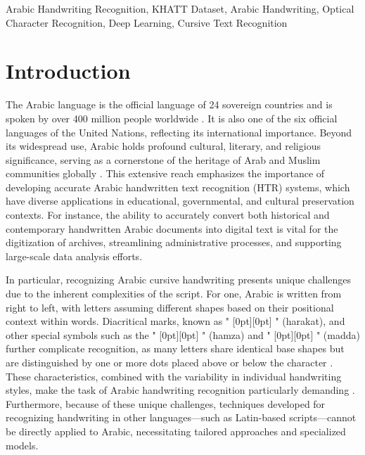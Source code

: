 \documentclass[conference]{IEEEtran}
\newcommand{\artext}[1]{%
  {\fontsize{8pt}{11pt}\selectfont \raisebox{0pt}[0pt][0pt]{\RL{#1}}}%
}
\begin{document}

\begin{IEEEkeywords}
Arabic Handwriting Recognition, KHATT Dataset, Arabic Handwriting, Optical Character Recognition, Deep Learning, Cursive Text Recognition
\end{IEEEkeywords}

\section{Introduction}

The Arabic language is the official language of 24 sovereign countries and is spoken by over 400 million people worldwide \cite{saeed2024muharaf}. It is also one of the six official languages of the United Nations, reflecting its international importance. Beyond its widespread use, Arabic holds profound cultural, literary, and religious significance, serving as a cornerstone of the heritage of Arab and Muslim communities globally \cite{ayuba2013}. This extensive reach emphasizes the importance of developing accurate Arabic handwritten text recognition (HTR) systems, which have diverse applications in educational, governmental, and cultural preservation contexts. For instance, the ability to accurately convert both historical and contemporary handwritten Arabic documents into digital text is vital for the digitization of archives, streamlining administrative processes, and supporting large-scale data analysis efforts.

In particular, recognizing Arabic cursive handwriting presents unique challenges due to the inherent complexities of the script. For one, Arabic is written from right to left, with letters assuming different shapes based on their positional context within words. Diacritical marks, known as "\artext{حركات}" (harakat), and other special symbols such as the "\artext{همزة}" (hamza) and "\artext{مدّة}" (madda) further complicate recognition, as many letters share identical base shapes but are distinguished by one or more dots placed above or below the character \cite{el1990arabic}. These characteristics, combined with the variability in individual handwriting styles, make the task of Arabic handwriting recognition particularly demanding \cite{mutawa2024machine}. Furthermore, because of these unique challenges, techniques developed for recognizing handwriting in other languages—such as Latin-based scripts—cannot be directly applied to Arabic, necessitating tailored approaches and specialized models.
\end{document}
